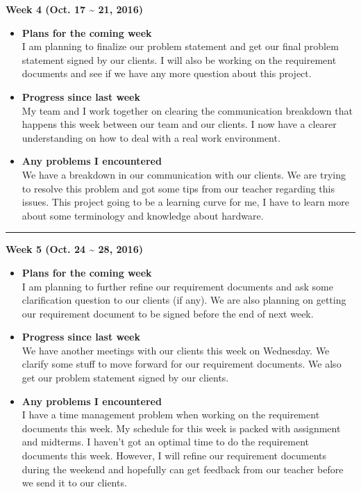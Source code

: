 		\begin{center}
			\textbf{Week 4 (Oct. 17 {\textasciitilde{}} 21, 2016)}
		\end{center}
		\begin{itemize}
			\item \textbf{Plans for the coming week}
			\\I am planning to finalize our problem statement and get our final problem statement signed by our clients. I will also be working on the requirement documents and see if we have any more question about this project.\\

			\item \textbf{Progress since last week}
			\\My team and I work together on clearing the communication breakdown that happens this week between our team and our clients. I now have a clearer understanding on how to deal with a real work environment. \\

			\item \textbf{Any problems I encountered}
			\\We have a breakdown in our communication with our clients. We are trying to resolve this problem and got some tips from our teacher regarding this issues. This project going to be a learning curve for me, I have to learn more about some terminology and knowledge about hardware.\\
		\end{itemize}

		\rule{\textwidth}{0.5pt}

		\begin{center}
			\textbf{Week 5 (Oct. 24 {\textasciitilde{}} 28, 2016)}
		\end{center}
		\begin{itemize}
			\item \textbf{Plans for the coming week}
			\\I am planning to further refine our requirement documents and ask some clarification question to our clients (if any). We are also planning on getting our requirement document to be signed before the end of next week.\\

			\item \textbf{Progress since last week}
			\\We have another meetings with our clients this week on Wednesday. We clarify some stuff to move forward for our requirement documents. We also get our problem statement signed by our clients.\\

			\item \textbf{Any problems I encountered}
			\\ I have a time management problem when working on the requirement documents this week. My schedule for this week is packed with assignment and midterms. I haven't got an optimal time to do the requirement documents this week. However, I will refine our requirement documents during the weekend and hopefully can get feedback from our teacher before we send it to our clients.\\
		\end{itemize}

